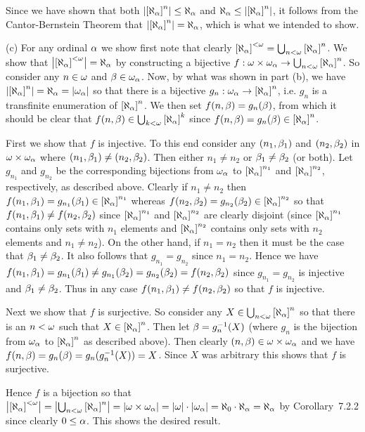 \begin{solution}
    Since we have shown that both $\left| \left[ \aleph_\alpha \right]^{n} \right| \leq \aleph_\alpha$ and $\aleph_\alpha \leq \left| \left[ \aleph_\alpha \right]^{n} \right|$, it follows from the Cantor-Bernstein Theorem that $\left| \left[ \aleph_\alpha \right]^{n} \right| = \aleph_\alpha$, which is what we intended to show. \qedsymbol

    (c) For any ordinal $\alpha$ we show first note that clearly $\left[ \aleph_\alpha \right]^{<\omega} = \bigcup_{n < \omega} \left[ \aleph_\alpha \right]^{n}$.
    We show that $\left| \left[ \aleph_\alpha \right]^{<\omega} \right| = \aleph_\alpha$ by constructing a bijective $f : \omega \times \omega_\alpha \to \bigcup_{n < \omega} \left[ \aleph_\alpha \right]^{n}$.
    So consider any $n \in \omega$ and $\beta \in \omega_\alpha$.
    Now, by what was shown in part (b), we have $\left| \left[ \aleph_\alpha \right]^{n} \right| = \aleph_\alpha = \left| \omega_\alpha \right|$ so that there is a bijective $g_n : \omega_\alpha \to \left[ \aleph_\alpha \right]^{n}$, i.e. $g_n$ is a transfinite enumeration of $\left[ \aleph_\alpha \right]^{n}$.
    We then set $f(n, \beta) = g_n(\beta)$, from which it should be clear that $f(n,\beta) \in \bigcup_{k < \omega} \left[ \aleph_\alpha \right]^{k}$ since $f(n, \beta) = g_n(\beta) \in \left[ \aleph_\alpha \right]^{n}$.

    First we show that $f$ is injective.
    To this end consider any $(n_1, \beta_1)$ and $(n_2, \beta_2)$ in $\omega \times \omega_\alpha$ where $(n_1, \beta_1) \neq (n_2, \beta_2)$.
    Then either $n_1 \neq n_2$ or $\beta_1 \neq \beta_2$ (or both).
    Let $g_{n_1}$ and $g_{n_2}$ be the corresponding bijections from $\omega_\alpha$ to $\left[ \aleph_\alpha \right]^{n_1}$ and $\left[ \aleph_\alpha \right]^{n_2}$, respectively, as described above.
    Clearly if $n_1 \neq n_2$ then $f(n_1, \beta_1) = g_{n_1}(\beta_1) \in \left[ \aleph_\alpha \right]^{n_1}$ whereas $f(n_2, \beta_2) = g_{n_2}(\beta_2) \in \left[ \aleph_\alpha \right]^{n_2}$ so that $f(n_1, \beta_1) \neq f(n_2, \beta_2)$ since $\left[ \aleph_\alpha \right]^{n_1}$ and $\left[ \aleph_\alpha \right]^{n_2}$ are clearly disjoint (since $\left[ \aleph_\alpha \right]^{n_1}$ contains only sets with $n_1$ elements and $\left[ \aleph_\alpha \right]^{n_2}$ contains only sets with $n_2$ elements and $n_1 \neq n_2$).
    On the other hand, if $n_1 = n_2$ then it must be the case that $\beta_1 \neq \beta_2$.
    It also follows that $g_{n_1} = g_{n_2}$ since $n_1 = n_2$.
    Hence we have $f(n_1, \beta_1) = g_{n_1}(\beta_1) \neq g_{n_1}(\beta_2) = g_{n_2}(\beta_2) = f(n_2, \beta_2)$ since $g_{n_1} = g_{n_2}$ is injective and $\beta_1 \neq \beta_2$.
    Thus in any case $f(n_1, \beta_1) \neq f(n_2, \beta_2)$ so that $f$ is injective.

    Next we show that $f$ is surjective.
    So consider any $X \in \bigcup_{n < \omega} \left[ \aleph_\alpha \right]^{n}$ so that there is an $n < \omega$ such that $X \in \left[ \aleph_\alpha \right]^{n}$.
    Then let $\beta = g_n^{-1}(X)$ (where $g_n$ is the bijection from $\omega_\alpha$ to $\left[ \aleph_\alpha \right]^{n}$ as described above).
    Then clearly $(n, \beta) \in \omega \times \omega_\alpha$ and we have $f(n, \beta) = g_n(\beta) = g_n(g_n^{-1}(X)) = X$.
    Since $X$ was arbitrary this shows that $f$ is surjective.

    Hence $f$ is a bijection so that $\left| \left[ \aleph_\alpha \right]^{<\omega} \right| = \left| \bigcup_{n < \omega} \left[ \aleph_\alpha \right]^{n} \right| = \left| \omega \times \omega_\alpha \right| = \left| \omega \right| \cdot \left| \omega_\alpha \right| = \aleph_0 \cdot \aleph_\alpha = \aleph_\alpha$ by Corollary~7.2.2 since clearly $0 \leq \alpha$.
    This shows the desired result. \qedsymbol
\end{solution}

